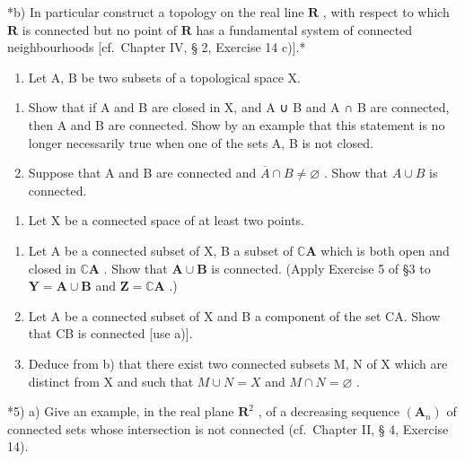 *b) In particular construct a topology on the real line \(\mathbf{R}\) , with respect to which \(\mathbf{R}\) is connected but no point of \(\mathbf{R}\) has a fundamental system of connected neighbourhoods {[}cf.~Chapter IV, § 2, Exercise 14 c){]}.*

\begin{enumerate}
\def\labelenumi{\arabic{enumi})}
\setcounter{enumi}{2}
\tightlist
\item
  Let A, B be two subsets of a topological space X.
\end{enumerate}

\begin{enumerate}
\def\labelenumi{\alph{enumi})}
\item
  Show that if A and B are closed in X, and A ∪ B and A ∩ B are connected, then A and B are connected. Show by an example that this statement is no longer necessarily true when one of the sets A, B is not closed.
\item
  Suppose that A and B are connected and \(\overline{A} \cap B \neq \varnothing\) . Show that \(A \cup B\) is connected.
\end{enumerate}

\begin{enumerate}
\def\labelenumi{\arabic{enumi})}
\setcounter{enumi}{3}
\tightlist
\item
  Let X be a connected space of at least two points.
\end{enumerate}

\begin{enumerate}
\def\labelenumi{\alph{enumi})}
\item
  Let A be a connected subset of X, B a subset of \(\mathbb{C}\mathbf{A}\) which is both open and closed in \(\mathbb{C}\mathbf{A}\) . Show that \(\mathbf{A} \cup \mathbf{B}\) is connected. (Apply Exercise 5 of §3 to \(\mathbf{Y} = \mathbf{A} \cup \mathbf{B}\) and \(\mathbf{Z} = \mathbb{C}\mathbf{A}\) .)
\item
  Let A be a connected subset of X and B a component of the set CA. Show that CB is connected {[}use a){]}.
\item
  Deduce from b) that there exist two connected subsets M, N of X which are distinct from X and such that \(M \cup N = X\) and \(M \cap N = \varnothing\) .
\end{enumerate}

*5) a) Give an example, in the real plane \(\mathbf{R}^2\) , of a decreasing sequence \((\mathbf{A}_n)\) of connected sets whose intersection is not connected (cf.~Chapter II, § 4, Exercise 14).

